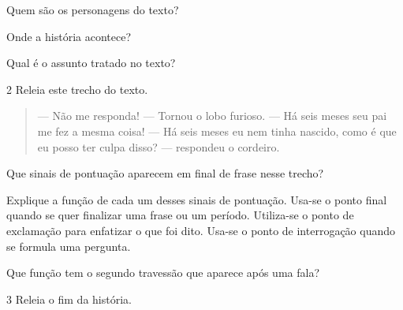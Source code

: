 \begin{escolha}
\item Quem são os personagens do texto?



\item Onde a história acontece?



\item Qual é o assunto tratado no texto?

\end{escolha}

\num{2} Releia este trecho do texto.

\begin{quote}
--- Não me responda! --- Tornou o lobo furioso.
--- Há seis meses seu pai me fez a mesma coisa!
--- Há seis meses eu nem tinha nascido, como é que eu posso ter culpa disso? --- respondeu o cordeiro.
\end{quote}

\begin{escolha}
\item Que sinais de pontuação aparecem em final de frase nesse trecho?



\item Explique a função de cada um desses sinais de pontuação. Usa-se o
ponto final quando se quer finalizar uma frase ou um período. Utiliza-se
o ponto de exclamação para enfatizar o que foi dito. Usa-se o ponto de
interrogação quando se formula uma pergunta.


\item Que função tem o segundo travessão que aparece após uma fala?

\end{escolha}

\num{3} Releia o fim da história.

